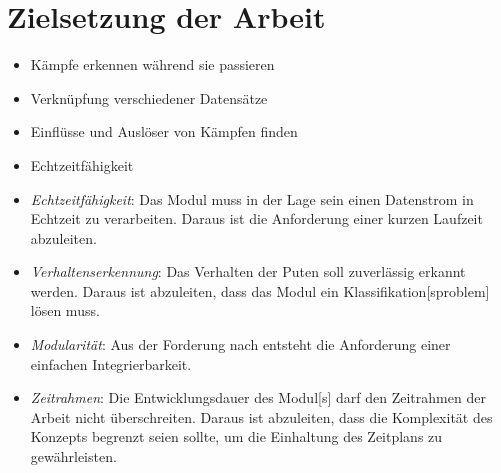 \section{Zielsetzung der Arbeit} \label{sec:Zielsetzung}

\begin{itemize}
    \item Kämpfe erkennen während sie passieren
    \item Verknüpfung verschiedener Datensätze
    \item Einflüsse und Auslöser von Kämpfen finden
    \item Echtzeitfähigkeit
\end{itemize}

\begin{itemize}
    \item \textit{Echtzeitfähigkeit}: Das \gls{Modul} muss in der Lage sein einen Datenstrom in Echtzeit zu verarbeiten. Daraus ist die Anforderung einer kurzen Laufzeit abzuleiten.
    \item \textit{Verhaltenserkennung}: Das Verhalten der Puten soll zuverlässig erkannt werden. Daraus ist abzuleiten, dass das \gls{Modul} ein \gls{Klassifikation}[sproblem] lösen muss.
    \item \textit{Modularität}: Aus der Forderung nach  entsteht die Anforderung einer einfachen Integrierbarkeit.
    \item \textit{Zeitrahmen}: Die Entwicklungsdauer des \gls{Modul}[s] darf den Zeitrahmen der Arbeit nicht überschreiten. Daraus ist abzuleiten, dass die Komplexität des Konzepts begrenzt seien sollte, um die Einhaltung des Zeitplans zu gewährleisten.
\end{itemize}